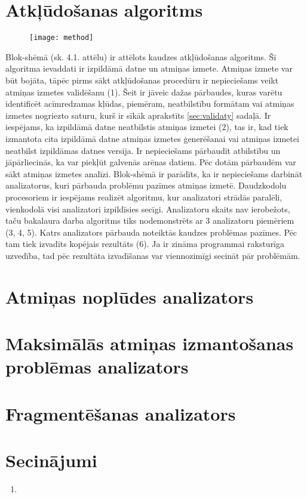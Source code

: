 ﻿\section{Atkļūdošanas algoritms}

 \begin{figure}[h]
\begin{center}
\texttt{[image: method]}
\end{center}
\caption{\textbf{\fontsize{11}{12}\selectfont {Uz metodi balstītā algoritma blok-shēma}}}
\end{figure}

Blok-shēmā (sk. 4.1. attēlu) ir attēlots kaudzes atkļūdošanas algoritms.
Šī algoritma ievaddati ir izpildāmā datne un atmiņas izmete.
Atmiņas izmete var būt bojāta, tāpēc pirms sākt atkļūdošanas procedūru ir nepieciešams veikt atmiņas izmetes validēšanu (1).
Šeit ir jāveic dažas pārbaudes, kuras varētu identificēt acīmredzamas kļūdas, piemēram, neatbilstību formātam vai atmiņas izmetes nogriezto saturu, kurš ir sīkāk aprakstīts \ref{sec:validaty} sadaļā.
Ir iespējams, ka izpildāmā datne neatbilstis atmiņas izmetei (2), tas ir, kad tiek izmantota cita izpildāmā datne atmiņas izmetes ģenerēšanai vai atmiņas izmetei neatbilst izpildāmas datnes versija.
Ir nepieciešams pārbaudīt atbilstību un jāpārliecinās, ka var piekļūt galvenās arēnas datiem.
Pēc dotām pārbaudēm var sākt atmiņas izmetes analīzi.
Blok-shēmā ir parādīts, ka ir nepieciešams darbināt analizatorus, kuri  pārbauda problēmu pazīmes atmiņas izmetē.
Daudzkodolu procesoriem ir iespējams realizēt algoritmu, kur analizatori strādās paralēli, vienkodolā visi analizatori izpildīsies secīgi. 
Analizatoru skaits nav ierobežots, taču bakalaura darba algoritms tiks nodemonstrēts ar 3 analizatoru piemēriem (3, 4, 5). 
Katrs analizators pārbauda noteiktās kaudzes problēmas pazīmes. 
Pēc tam tiek izvadīts kopējais rezultāts (6).
Ja ir zināma programmai raksturīga uzvedība, tad pēc rezultāta izvadīšanas var viennozimīgi secināt pār problēmām.




\section{Atmiņas noplūdes analizators}
\section{Maksimālās atmiņas izmantošanas problēmas analizators}
\section{Fragmentēšanas analizators}





\section{Secinājumi}
\begin{enumerate}
\item 
\end{enumerate}


